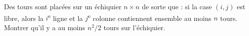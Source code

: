 Des tours sont placées sur un échiquier $n \times n$ de sorte que : si la case $(i, j)$ est libre, alors la $i$\textsuperscript{e} ligne et la $j$\textsuperscript{e} colonne contiennent ensemble au moins $n$ tours. Montrer qu'il y a au moins $n^2/2$ tours sur l'échiquier.
